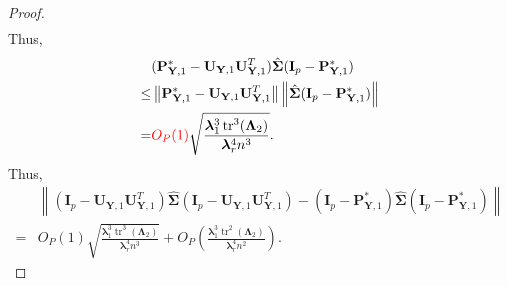 \documentclass[12pt]{article} %
\DeclareMathOperator{\mytr}{tr}
\newcommand{\bP}{\mathbf{P}}
\newcommand{\bY}{\mathbf{Y}}
\newcommand{\bI}{\mathbf{I}}
\newcommand{\bU}{\mathbf{U}}
\newcommand{\bfsym}[1]{\ensuremath{\boldsymbol{#1}}}
\def\blambda {\bfsym {\lambda}}
\def\bLambda {\bfsym {\Lambda}}
\def\bSigma {\bfsym {\Sigma}}
\theoremstyle{definition}
\begin{document}
\begin{appendices}
\begin{proof}
\begin{equation*}
\begin{split}
        \end{split}
    \end{equation*}
    Thus,
    \begin{equation*}
        \begin{split}
             &(\bP^*_{\bY,1}-\bU_{\bY,1}\bU_{\bY,1}^T)\hat{\bSigma}(\bI_p-\bP^*_{\bY,1})
             \\
             \leq &
             \left\|\bP^*_{\bY,1}-\bU_{\bY,1}\bU_{\bY,1}^T\right\|
             \left\|\hat{\bSigma}(\bI_p-\bP^*_{\bY,1})\right\|
             \\
             =&{\color{red} O_P(1)}\sqrt{\frac{\blambda_1^3 \mytr^3 (\bLambda_2)}{\blambda_r^4 n^3}}.
        \end{split}
    \end{equation*}
    Thus,
    \begin{equation*}
        \begin{split}
             &\left\|(\bI_p -\bU_{\bY,1}\bU_{\bY,1}^T)\hat{\bSigma}(\bI_p -\bU_{\bY,1}\bU_{\bY,1}^T)
             -
             (\bI_p-\bP^*_{\bY,1})\hat{\bSigma}(\bI_p-\bP^*_{\bY,1})\right\|
             \\
             =&
             O_P(1)\sqrt{\frac{\blambda_1^3 \mytr^3 (\bLambda_2)}{\blambda_r^4 n^3}}
             +
             O_P\left(\frac{\blambda_1^3 \mytr^2 (\bLambda_2)}{\blambda_r^4 n^2}\right).
        \end{split}
    \end{equation*}


\end{proof}
\end{appendices}
\end{document}
